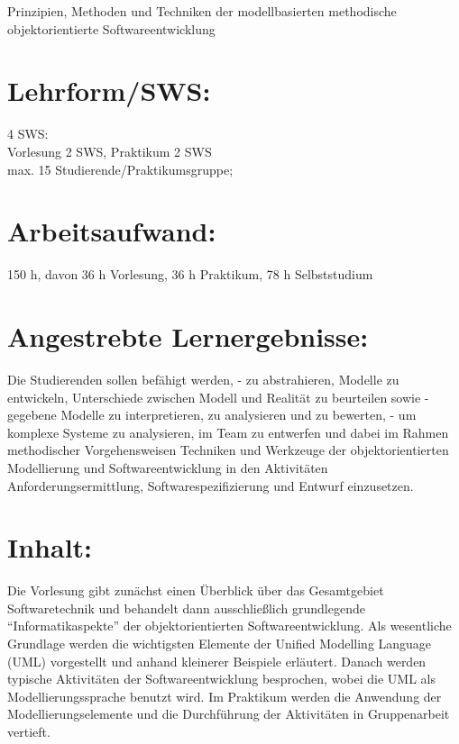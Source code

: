 Prinzipien, Methoden und Techniken der modellbasierten methodische
objektorientierte Softwareentwicklung

\section{Lehrform/SWS:}\label{lehrformsws-21}

4 SWS:\\
Vorlesung 2 SWS, Praktikum 2 SWS\\
max. 15 Studierende/Praktikumsgruppe;

\section{Arbeitsaufwand:}\label{arbeitsaufwand-21}

150 h, davon 36 h Vorlesung, 36 h Praktikum, 78 h Selbststudium

\section{Angestrebte
Lernergebnisse:}\label{angestrebte-lernergebnisse-26}

Die Studierenden sollen befähigt werden, - zu abstrahieren, Modelle zu
entwickeln, Unterschiede zwischen Modell und Realität zu beurteilen
sowie - gegebene Modelle zu interpretieren, zu analysieren und zu
bewerten, - um komplexe Systeme zu analysieren, im Team zu entwerfen und
dabei im Rahmen methodischer Vorgehensweisen Techniken und Werkzeuge der
objektorientierten Modellierung und Softwareentwicklung in den
Aktivitäten Anforderungsermittlung, Softwarespezifizierung und Entwurf
einzusetzen.

\section{Inhalt:}\label{inhalt-26}

Die Vorlesung gibt zunächst einen Überblick über das Gesamtgebiet
Softwaretechnik und behandelt dann ausschließlich grundlegende
``Informatikaspekte'' der objektorientierten Softwareentwicklung. Als
wesentliche Grundlage werden die wichtigsten Elemente der Unified
Modelling Language (UML) vorgestellt und anhand kleinerer Beispiele
erläutert. Danach werden typische Aktivitäten der Softwareentwicklung
besprochen, wobei die UML als Modellierungssprache benutzt wird. Im
Praktikum werden die Anwendung der Modellierungselemente und die
Durchführung der Aktivitäten in Gruppenarbeit vertieft.

